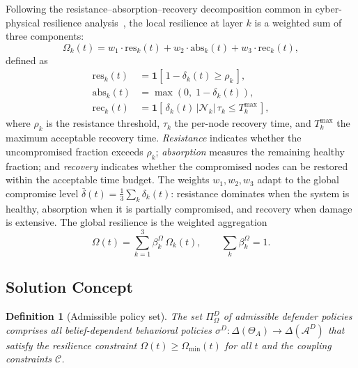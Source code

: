 \documentclass[conference]{IEEEtran}
\newtheorem{definition}{Definition}
\newcommand{\indic}{\mathbf{1}}
\begin{document}
Following the resistance--absorption--recovery decomposition common in
cyber-physical resilience analysis~\cite{henry2012,linkov2014,zhu2015}, the local
resilience at layer $k$ is a weighted sum of three components:
\begin{equation}
\Omega_k(t) = w_1 \cdot \mathrm{res}_k(t) + w_2 \cdot \mathrm{abs}_k(t) +
w_3 \cdot \mathrm{rec}_k(t),
\end{equation}
defined as
\begin{align}
\mathrm{res}_k(t) &= \indic\!\left[\,1-\delta_k(t) \geq \rho_k\,\right], \\
\mathrm{abs}_k(t) &= \max\!\left(0,\; 1-\delta_k(t)\right), \\
\mathrm{rec}_k(t) &= \indic\!\left[\,\delta_k(t)\,|\mathcal{N}_k|\,\tau_k
\leq T_k^{\max}\,\right],
\end{align}
where $\rho_k$ is the resistance threshold, $\tau_k$ the per-node recovery time,
and $T_k^{\max}$ the maximum acceptable recovery time.
\emph{Resistance} indicates whether the uncompromised fraction exceeds $\rho_k$;
\emph{absorption} measures the remaining healthy fraction; and \emph{recovery}
indicates whether the compromised nodes can be restored within the acceptable
time budget. The weights $w_1,w_2,w_3$ adapt to the global compromise level
$\bar\delta(t)=\frac13\sum_k\delta_k(t)$: resistance dominates when the system
is healthy, absorption when it is partially compromised, and recovery when
damage is extensive. The global resilience is the weighted aggregation
\begin{equation}
\Omega(t) = \sum_{k=1}^3 \beta_k^\Omega\, \Omega_k(t),
\qquad \sum_k\beta_k^\Omega = 1.
\end{equation}

\subsection{Solution Concept}

\begin{definition}[Admissible policy set]
\label{def:admissible}
The set $\Pi^D_\Omega$ of admissible defender policies comprises all
belief-dependent behavioral policies $\sigma^D:\Delta(\Theta_A)\to
\Delta(\mathcal{A}^D)$ that satisfy the resilience constraint
$\Omega(t)\geq\Omega_{\min}(t)$ for all $t$ and the coupling constraints
$\mathcal{C}$.
\end{definition}
\end{document}
